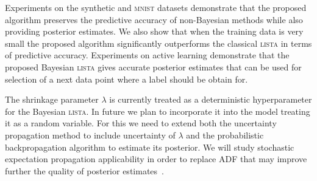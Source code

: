 \documentclass[letterpaper]{article}
\begin{document}
Experiments on the synthetic and \textsc{mnist} datasets demonstrate that the proposed algorithm preserves the predictive accuracy of non-Bayesian methods while also providing posterior estimates. We also show that when the training data is very small the proposed algorithm significantly outperforms the classical \textsc{lista} in terms of predictive accuracy. Experiments on active learning demonstrate that the proposed Bayesian \textsc{lista} gives accurate posterior estimates that can be used for selection of a next data point where a label should be obtain for. 

The shrinkage parameter $\lambda$ is currently treated as a deterministic hyperparameter for the Bayesian \textsc{lista}. In future we plan to incorporate it into the model treating it as a random variable. For this we need to extend both the uncertainty propagation method to include uncertainty of $\lambda$ and the probabilistic backpropagation algorithm to estimate its posterior. We will study stochastic expectation propagation applicability in order to replace ADF that may improve further the quality of posterior estimates~\citep{li2015stochastic}.    


\end{document}

